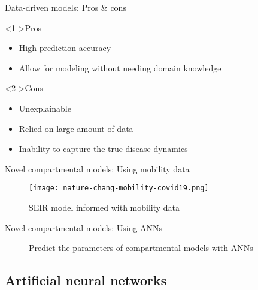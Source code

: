 \begin{frame}{Data-driven models: Pros \& cons}
    \begin{exampleblock}<1->{Pros}
    \begin{itemize}
        \item High prediction accuracy
        \item Allow for modeling without needing domain knowledge
    \end{itemize}
    \end{exampleblock}

    \begin{alertblock}<2->{Cons}
    \begin{itemize}
        \item Unexplainable
        \item Relied on large amount of data
        \item Inability to capture the true disease dynamics
    \end{itemize}
    \end{alertblock}
\end{frame}

\begin{frame}{Novel compartmental models: Using mobility data}
    \begin{figure}[!htb]
        \centering
        \texttt{[image: nature-chang-mobility-covid19.png]}
        \caption{SEIR model informed with mobility data \cite{changMobilityNetworkModels2021}}
        \label{fig:nature-chang-mobility-covid19}
    \end{figure}
\end{frame}

\begin{frame}{Novel compartmental models: Using ANNs}
    \begin{figure}[!htb]
        \centering
        \caption{Predict the parameters of compartmental models with \glspl{ANN}}
        \label{fig:compartmentals-models-with-neural-networks}
    \end{figure}
\end{frame}

\subsection{Artificial neural networks}


